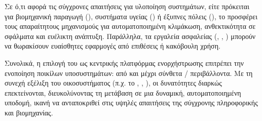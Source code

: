 Σε ό,τι αφορά τις σύγχρονες απαιτήσεις για υλοποίηση  συστημάτων, είτε πρόκειται για βιομηχανική παραγωγή (), συστήματα υγείας () ή έξυπνες πόλεις (), το  προσφέρει τους απαραίτητους μηχανισμούς για αυτοματοποιημένη κλιμάκωση, ανθεκτικότητα σε σφάλματα και ευέλικτη ανάπτυξη. Παράλληλα, τα εργαλεία ασφαλείας (, , ) μπορούν να θωρακίσουν ευαίσθητες εφαρμογές από επιθέσεις ή κακόβουλη χρήση.

Συνολικά, η επιλογή του  ως κεντρικής πλατφόρμας ενορχήστρωσης επιτρέπει την ενοποίηση ποικίλων υποσυστημάτων: από  και  μέχρι σύνθετα / περιβάλλοντα. Με τη συνεχή εξέλιξη του οικοσυστήματος (π.χ. το , , ), οι δυνατότητες διαρκώς επεκτείνονται, διευκολύνοντας τη μετάβαση σε μια δυναμική, αυτοματοποιημένη υποδομή, ικανή να ανταποκριθεί στις υψηλές απαιτήσεις της σύγχρονης πληροφορικής και βιομηχανίας.